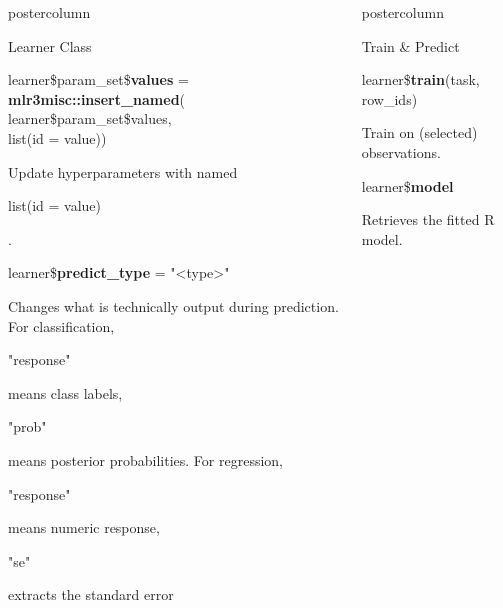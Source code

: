 \documentclass{beamer}
\newlength{\columnheight} %
\newcommand{\codeinline}[1]{\begin{codeboxinline}#1\end{codeboxinline}}
\begin{document}
\begin{frame}[fragile]{}
\begin{columns}
\begin{column}{.245\textwidth}
\begin{beamercolorbox}[center]{postercolumn}
\begin{minipage}{.98\textwidth}
{\begin{myblock}{Learner Class}
\begin{codeboxmultiline}[width=18cm]
							learner\$param\_set\$\textbf{values} = \\
							\hspace*{1ex} \textbf{mlr3misc::insert\_named}(\\
							\hspace*{2ex} learner\$param\_set\$values,
							\\
							\hspace*{2ex} list(id = value))
						\end{codeboxmultiline}
						Update hyperparameters with named \codeinline{list(id = value)}.
						\vspace{1em}
						\\
						\begin{codebox}
							learner\$\textbf{predict\_type} = "<type>"
						\end{codebox}
						Changes what is technically output during prediction. For classification, 
                        \codeinline{"response"} means class labels, \codeinline{"prob"} means posterior probabilities. For regression, \codeinline{"response"} means numeric response, 
                        \codeinline{"se"} extracts the standard error 
						\vspace{1em}
					\end{myblock}
					\vfill
					}
				\end{minipage}
			\end{beamercolorbox}
		\end{column}
		\begin{column}{.245\textwidth}
			\begin{beamercolorbox}[center]{postercolumn}
				\begin{minipage}{.98\textwidth}
					\parbox[t][\columnheight]{\textwidth}{
						\begin{myblock}{Train \& Predict}
						\begin{codebox}
							learner\$\textbf{train}(task, row\_ids)
						\end{codebox}
                        Train on (selected) observations. 
						\\
						\begin{codebox}
							learner\$\textbf{model}
						\end{codebox}
						Retrieves the fitted R model.
						\\

\end{myblock}}
\end{minipage}
\end{beamercolorbox}
\end{column}
\end{columns}
\end{frame}
\end{document}

